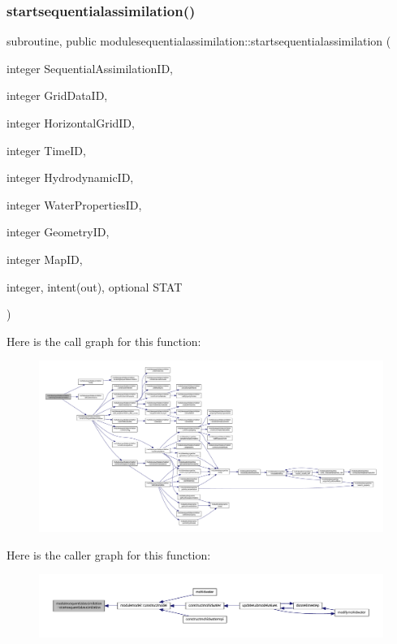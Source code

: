\subsubsection{\texorpdfstring{startsequentialassimilation()}{startsequentialassimilation()}}
{\footnotesize\ttfamily subroutine, public modulesequentialassimilation\+::startsequentialassimilation (\begin{DoxyParamCaption}\item[{integer}]{Sequential\+Assimilation\+ID,  }\item[{integer}]{Grid\+Data\+ID,  }\item[{integer}]{Horizontal\+Grid\+ID,  }\item[{integer}]{Time\+ID,  }\item[{integer}]{Hydrodynamic\+ID,  }\item[{integer}]{Water\+Properties\+ID,  }\item[{integer}]{Geometry\+ID,  }\item[{integer}]{Map\+ID,  }\item[{integer, intent(out), optional}]{S\+T\+AT }\end{DoxyParamCaption})}

Here is the call graph for this function\+:\nopagebreak
\begin{figure}[H]
\begin{center}
\leavevmode
\includegraphics[width=350pt]{namespacemodulesequentialassimilation_af7b9f893222a8a590e41b22e1cbb87e8_cgraph}
\end{center}
\end{figure}
Here is the caller graph for this function\+:\nopagebreak
\begin{figure}[H]
\begin{center}
\leavevmode
\includegraphics[width=350pt]{namespacemodulesequentialassimilation_af7b9f893222a8a590e41b22e1cbb87e8_icgraph}
\end{center}
\end{figure}
\mbox{\label{namespacemodulesequentialassimilation_a413c75d9b44cd4a5fdf9caf890550305}} 
